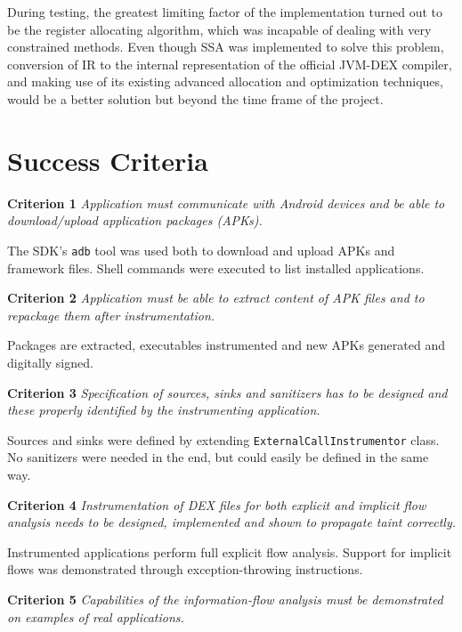 \documentclass[12pt,twoside,notitlepage]{report}
\begin{document}
During testing, the greatest limiting factor of the implementation turned out to be the register allocating algorithm, which was incapable of dealing with very constrained methods. Even though SSA was implemented to solve this problem, conversion of IR to the internal representation of the official JVM-DEX compiler, and making use of its existing advanced allocation and optimization techniques, would be a better solution but beyond the time frame of the project.

\section{Success Criteria}

\begin{description}
	\item \textbf{Criterion 1} \emph{Application must communicate with Android devices and be able to download/upload application packages (APKs).}

	The SDK's \verb$adb$ tool was used both to download and upload APKs and framework files. Shell commands were executed to list installed applications.

	\item \textbf{Criterion 2} \emph{Application must be able to extract content of APK files and to repackage them after instrumentation.}

	Packages are extracted, executables instrumented and new APKs generated and digitally signed.

	\item \textbf{Criterion 3} \emph{Specification of sources, sinks and sanitizers has to be designed and these properly identified by the instrumenting application.}

	Sources and sinks were defined by extending \verb$ExternalCallInstrumentor$ class. No sanitizers were needed in the end, but could easily be defined in the same way.

	\item \textbf{Criterion 4} \emph{Instrumentation of DEX files for both explicit and implicit flow analysis needs to be designed, implemented and shown to propagate taint correctly.}

	Instrumented applications perform full explicit flow analysis. Support for implicit flows was demonstrated through exception-throwing instructions.

	\item \textbf{Criterion 5} \emph{Capabilities of the information-flow analysis must be demonstrated on examples of real applications.}


\end{description}
\end{document}
